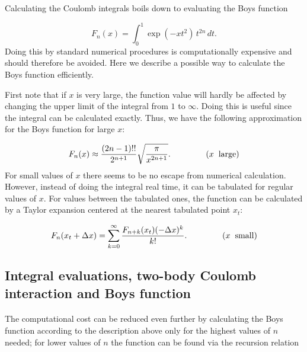 \documentclass[%
twoside,                 %
final,                   %
10pt]{article}
\begin{document}
Calculating the Coulomb integrals boils down to evaluating the Boys function

\begin{equation}
 F_n(x) = \int_0^1\exp(-xt^2)\,t^{2n}\,dt.
\end{equation}
Doing this by standard numerical procedures is computationally
expensive and should therefore be avoided. Here we describe a possible way to calculate the Boys function efficiently.

First note that if $x$ is very large, the function value will hardly be affected by changing the upper limit of the integral from $1$ to $\infty$. Doing this is useful
since the integral can be calculated exactly. Thus, we have the following approximation for the Boys function for large $x$:

\begin{equation}
 F_n(x) \approx \frac{(2n-1)!!}{2^{n+1}}\sqrt{\frac{\pi}{x^{2n+1}}}. \hspace{15mm} (x\hspace{2mm}\mathrm{large})
\end{equation}
For small values of $x$ there seems to be no escape from numerical calculation. However, instead of doing the integral real time, it can be tabulated for regular values of $x$.
For values between the tabulated ones, the function can be calculated by a Taylor expansion centered at the nearest tabulated point $x_t$:

\begin{equation}
 F_n(x_t+\Delta x) = \sum_{k=0}^\infty\frac{F_{n+k}(x_t) (-\Delta x)^k}{k!}. \hspace{15mm} (x\hspace{2mm}\mathrm{small})
\end{equation}



\subsection{Integral evaluations, two-body Coulomb interaction and Boys function}

\paragraph{}

The computational cost can be reduced even further by calculating the Boys function according to the description above only for the highest values of $n$ needed; for lower values of $n$ the function
can be found via the recursion relation
\end{document}
